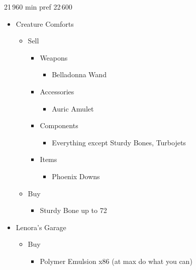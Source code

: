 \documentclass{report}
\begin{document}
\begin{shop}{21\,960 min pref 22\,600}
\begin{itemize}
    \item Creature Comforts
    \begin{itemize}
        \item Sell
        \begin{itemize}
            \item Weapons
            \begin{itemize}
                \item Belladonna Wand
            \end{itemize}
            \item Accessories
            \begin{itemize}
                \item Auric Amulet
            \end{itemize}
            \item Components
            \begin{itemize}
                \item Everything except Sturdy Bones, Turbojets
            \end{itemize}
            \item Items
            \begin{itemize}
                \item Phoenix Downs
            \end{itemize}
        \end{itemize}
        \item Buy
        \begin{itemize}
            \item Sturdy Bone up to 72
        \end{itemize}
    \end{itemize}
    \item Lenora's Garage
    \begin{itemize}
        \item Buy
        \begin{itemize}
            \item Polymer Emulsion x86 (at max do what you can)
        \end{itemize}
    \end{itemize}
\end{itemize}
\end{shop}
\end{document}
